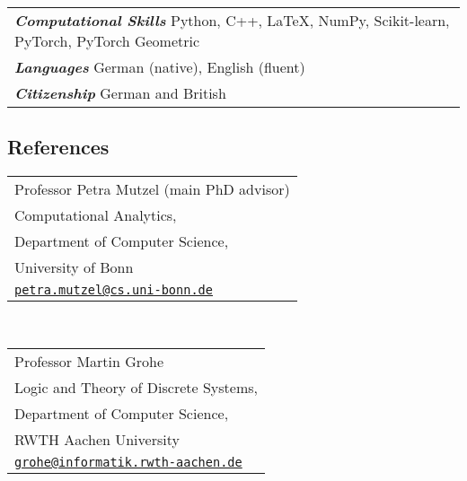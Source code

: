 \documentclass[11pt, a4paper, DIV=14, headings=small]{scrartcl}
\begin{document}
	\begin{tabular}{l}
		\textsf{\textbf{\em Computational Skills}} Python, C\hspace{-1pt}+\hspace{-1pt}+, \LaTeX, NumPy, Scikit-learn, PyTorch, PyTorch Geometric \\[0.2em]
		\textsf{\textbf{\em Languages}} German (native), English (fluent)                                                                         \\[0.2em]
		\textsf{\textbf{\em Citizenship}} German and British\\
	\end{tabular}
	
	\subsection*{References}
	
	\begin{tabular}{l}
		Professor Petra Mutzel (main PhD advisor)                                       \\
		Computational Analytics,                                                        \\
		Department of Computer Science,                                                 \\
		University of Bonn                                                              \\
		\href{mailto:petra.mutzel@cs.uni-bonn.de}{\texttt{petra.mutzel@cs.uni-bonn.de}} \\
	\end{tabular}\\[0.5em]
	
	
	\begin{tabular}{l}
		Professor Martin Grohe                                                    \\
		Logic and Theory of Discrete Systems,                                                   \\
		Department of Computer Science,                                                         \\
		RWTH Aachen University                                                                  \\
		\href{mailto:grohe@informatik.rwth-aachen.de}{\texttt{grohe@informatik.rwth-aachen.de}} \\
	\end{tabular}\\[0.5em]
	
\end{document}
